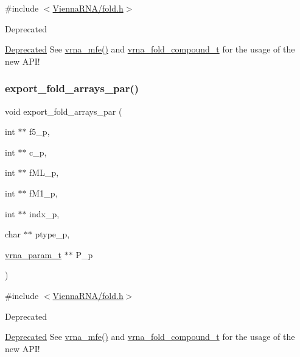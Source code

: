 {\ttfamily \#include $<$\mbox{\hyperlink{fold_8h}{Vienna\+R\+N\+A/fold.\+h}}$>$}

\begin{DoxyRefDesc}{Deprecated}
\item[\mbox{\hyperlink{deprecated__deprecated000072}{Deprecated}}]See \mbox{\hyperlink{group__mfe__global_gabd3b147371ccf25c577f88bbbaf159fd}{vrna\+\_\+mfe()}} and \mbox{\hyperlink{group__fold__compound_ga1b0cef17fd40466cef5968eaeeff6166}{vrna\+\_\+fold\+\_\+compound\+\_\+t}} for the usage of the new A\+P\+I!\end{DoxyRefDesc}
\mbox{\label{group__mfe__global__deprecated_ga6606ec0ec964ea506fdadb997a1a5328}} 
\subsubsection{\texorpdfstring{export\_fold\_arrays\_par()}{export\_fold\_arrays\_par()}}
{\footnotesize\ttfamily void export\+\_\+fold\+\_\+arrays\+\_\+par (\begin{DoxyParamCaption}\item[{int $\ast$$\ast$}]{f5\+\_\+p,  }\item[{int $\ast$$\ast$}]{c\+\_\+p,  }\item[{int $\ast$$\ast$}]{f\+M\+L\+\_\+p,  }\item[{int $\ast$$\ast$}]{f\+M1\+\_\+p,  }\item[{int $\ast$$\ast$}]{indx\+\_\+p,  }\item[{char $\ast$$\ast$}]{ptype\+\_\+p,  }\item[{\mbox{\hyperlink{group__energy__parameters_ga8a69ca7d787e4fd6079914f5343a1f35}{vrna\+\_\+param\+\_\+t}} $\ast$$\ast$}]{P\+\_\+p }\end{DoxyParamCaption})}



{\ttfamily \#include $<$\mbox{\hyperlink{fold_8h}{Vienna\+R\+N\+A/fold.\+h}}$>$}

\begin{DoxyRefDesc}{Deprecated}
\item[\mbox{\hyperlink{deprecated__deprecated000073}{Deprecated}}]See \mbox{\hyperlink{group__mfe__global_gabd3b147371ccf25c577f88bbbaf159fd}{vrna\+\_\+mfe()}} and \mbox{\hyperlink{group__fold__compound_ga1b0cef17fd40466cef5968eaeeff6166}{vrna\+\_\+fold\+\_\+compound\+\_\+t}} for the usage of the new A\+P\+I!\end{DoxyRefDesc}
\mbox{\label{group__mfe__global__deprecated_ga04d5d639fd4473ca766436a9bae5665c}} 
